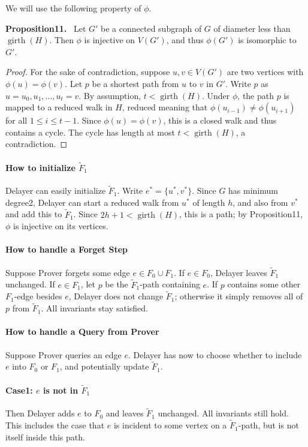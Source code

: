 \documentclass[10pt,a4paper]{article}
\newenvironment{authorclaim}[1]{\par\medskip\noindent\textbf{#1.}\ \ignorespaces}{\par\medskip}
\begin{document}
We will use the following property of $\phi$.
\begin{authorclaim}{Proposition11}
Let $G'$ be a connected subgraph of $G$ of diameter less than $\operatorname{girth}(H)$. Then $\phi$ is injective on $V(G')$, and thus $\phi(G')$ is isomorphic to $G'$.
\end{authorclaim}
\begin{proof}
For the sake of contradiction, suppose $u,v\in V(G')$ are two vertices with $\phi(u)=\phi(v)$. Let $p$ be a shortest path from $u$ to $v$ in $G'$. Write $p$ as $u=u_0,u_1,\ldots,u_t=v$. By assumption, $t<\operatorname{girth}(H)$. Under $\phi$, the path $p$ is mapped to a reduced walk in $H$, reduced meaning that $\phi(u_{i-1})\ne\phi(u_{i+1})$ for all $1\le i\le t-1$. Since $\phi(u)=\phi(v)$, this is a closed walk and thus contains a cycle. The cycle has length at most $t<\operatorname{girth}(H)$, a contradiction.
\end{proof}
\paragraph{How to initialize $\widetilde F_1$}
Delayer can easily initialize $\widetilde F_1$. Write $e^*=\{u^*,v^*\}$. Since $G$ has minimum degree2, Delayer can start a reduced walk from $u^*$ of length $h$, and also from $v^*$ and add this to $\widetilde F_1$. Since $2h+1<\operatorname{girth}(H)$, this is a path; by Proposition11, $\phi$ is injective on its vertices.
\paragraph{How to handle a Forget Step}
Suppose Prover forgets some edge $e\in F_0\cup F_1$. If $e\in F_0$, Delayer leaves $\widetilde F_1$ unchanged. If $e\in F_1$, let $p$ be the $\widetilde F_1$-path containing $e$. If $p$ contains some other $F_1$-edge besides $e$, Delayer does not change $\widetilde F_1$; otherwise it simply removes all of $p$ from $\widetilde F_1$. All invariants stay satisfied.
\paragraph{How to handle a Query from Prover}
Suppose Prover queries an edge $e$. Delayer has now to choose whether to include $e$ into $F_0$ or $F_1$, and potentially update $\widetilde F_1$.
\paragraph{Case1: $e$ is not in $\widetilde F_1$}
Then Delayer adds $e$ to $F_0$ and leaves $\widetilde F_1$ unchanged. All invariants still hold. This includes the case that $e$ is incident to some vertex on a $\widetilde F_1$-path, but is not itself inside this path.
\end{document}
